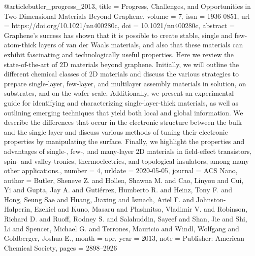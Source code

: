{@article{butler_progress_2013,
	title = {Progress, {Challenges}, and {Opportunities} in {Two}-{Dimensional} {Materials} {Beyond} {Graphene}},
	volume = {7},
	issn = {1936-0851},
	url = {https://doi.org/10.1021/nn400280c},
	doi = {10.1021/nn400280c},
	abstract = {Graphene’s success has shown that it is possible to create stable, single and few-atom-thick layers of van der Waals materials, and also that these materials can exhibit fascinating and technologically useful properties. Here we review the state-of-the-art of 2D materials beyond graphene. Initially, we will outline the different chemical classes of 2D materials and discuss the various strategies to prepare single-layer, few-layer, and multilayer assembly materials in solution, on substrates, and on the wafer scale. Additionally, we present an experimental guide for identifying and characterizing single-layer-thick materials, as well as outlining emerging techniques that yield both local and global information. We describe the differences that occur in the electronic structure between the bulk and the single layer and discuss various methods of tuning their electronic properties by manipulating the surface. Finally, we highlight the properties and advantages of single-, few-, and many-layer 2D materials in field-effect transistors, spin- and valley-tronics, thermoelectrics, and topological insulators, among many other applications.},
	number = {4},
	urldate = {2020-05-05},
	journal = {ACS Nano},
	author = {Butler, Sheneve Z. and Hollen, Shawna M. and Cao, Linyou and Cui, Yi and Gupta, Jay A. and Gutiérrez, Humberto R. and Heinz, Tony F. and Hong, Seung Sae and Huang, Jiaxing and Ismach, Ariel F. and Johnston-Halperin, Ezekiel and Kuno, Masaru and Plashnitsa, Vladimir V. and Robinson, Richard D. and Ruoff, Rodney S. and Salahuddin, Sayeef and Shan, Jie and Shi, Li and Spencer, Michael G. and Terrones, Mauricio and Windl, Wolfgang and Goldberger, Joshua E.},
	month = apr,
	year = {2013},
	note = {Publisher: American Chemical Society},
	pages = {2898--2926}
}

}
